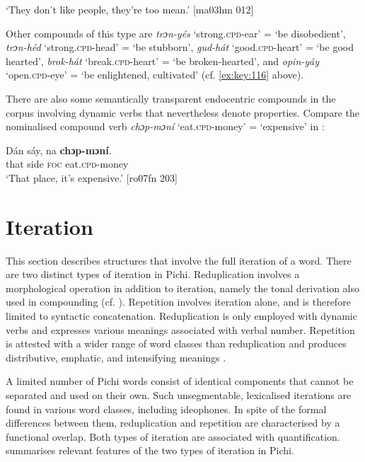 \glt ‘They don’t like people, they’re too mean.’ [ma03hm 012]
\z

Other compounds of this type are \textit{trɔn-yés} ‘strong.\textsc{cpd}{}-ear’ = ‘be disobedient’, \textit{trɔn-héd} ‘strong.\textsc{cpd}{}-head’ = ‘be stubborn’, \textit{gud-hát} ‘good.\textsc{cpd}{}-heart’ = ‘be good hearted’, \textit{brok-hát} ‘break.\textsc{cpd}{}-heart’ = ‘be broken-hearted’, and \textit{opin-yáy} ‘open.\textsc{cpd}{}-eye’ = ‘be enlightened, cultivated’ (cf. \ref{ex:key:116} above).


 There are also some semantically transparent endocentric compounds in the corpus involving dynamic verbs  that nevertheless denote properties. Compare the nominalised compound verb \textit{chɔp-mɔní} ‘eat.\textsc{cpd}{}-money’ = ‘expensive’ in :



\ea%
    \label{ex:key:134}
    \gll Dán    sáy,    na  \textbf{chɔp-mɔní}.\\
that    side    \textsc{foc}  eat.\textsc{cpd}{}-money\\

\glt ‘That place, it’s expensive.’ [ro07fn 203]
\z

\section{Iteration}\label{sec:4.5}

This section describes structures that involve the full iteration of a word. There are two distinct types of iteration in Pichi. Reduplication involves a morphological operation in addition to iteration, namely the tonal derivation also used in compounding (cf. ). Repetition involves iteration alone, and is therefore limited to syntactic concatenation. Reduplication is only employed with dynamic verbs and expresses various meanings associated with verbal number. Repetition is attested with a wider range of word classes than reduplication and produces distributive, emphatic, and intensifying meanings \citep{Yakpo2012}. 


A limited number of Pichi words consist of identical components that cannot be separated and used on their own. Such unsegmentable, lexicalised iterations are found in various word classes, including ideophones. In spite of the formal differences between them, reduplication and repetition are characterised by a functional overlap. Both types of iteration are associated with quantification.  summarises relevant features of the two types of iteration in Pichi.


